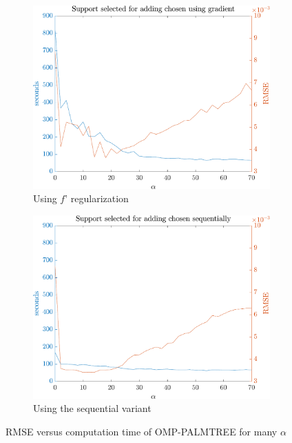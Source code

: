 \begin{figure}[!ht] \centering
\begin{subfigure}[b]{0.49\textwidth}\centering
\includegraphics[width=\textwidth]{figures/tree-gradient-vs-sequential/gradient_used.pdf}
	\caption{Using $f’$ regularization}\label{fig_cmp_rmse_vs_time_grad}
\end{subfigure}
\begin{subfigure}[b]{0.49\textwidth}\centering
\includegraphics[width=\textwidth]{figures/tree-gradient-vs-sequential/gradient_not_used.pdf} 
	\caption{Using the sequential variant}\label{fig_cmp_rmse_vs_time_seq}
\end{subfigure}	
\caption{RMSE versus computation time of OMP-PALMTREE for many $\alpha$}\label{fig_cmp_rmse_vs_time}
\end{figure}
\FloatBarrier

